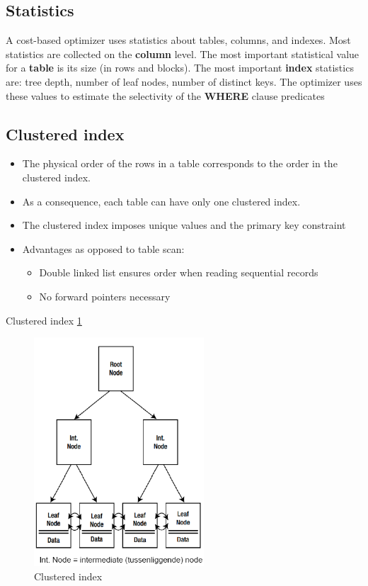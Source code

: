 \documentclass{report}
\begin{document}
    \subsection{Statistics}
    A cost-based optimizer uses statistics about tables, columns, and indexes. Most statistics are collected on the \textbf{column} level. The most important statistical value for a \textbf{table} is its size (in rows and blocks). The most important \textbf{index} statistics are: tree depth, number of leaf nodes, number of distinct keys. The optimizer uses these values to estimate the selectivity of the \textbf{WHERE} clause predicates
    \subsection{Clustered index}
        \begin{itemize} 
            \item The physical order of the rows in a table corresponds to the order in the clustered index.
            \item As a consequence, each table can have only one clustered index.
            \item The clustered index imposes unique values and the primary key constraint
            \item Advantages as opposed to table scan:
                \begin{itemize} 
                    \item Double linked list ensures order when reading sequential records
                    \item No forward pointers necessary
                \end{itemize}
        \end{itemize}
        Clustered index \ref{fig:clustered_index}
        \begin{figure}
            \includegraphics[width=180pt]{./images/clustered_index.png}
            \caption{\label{fig:clustered_index}Clustered index}
        \end{figure}
\end{document}
